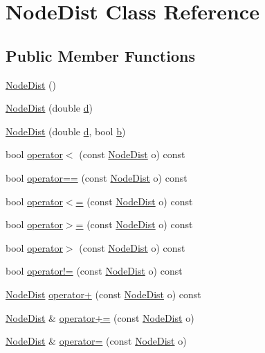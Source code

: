 \hypertarget{class_node_dist}{}\section{Node\+Dist Class Reference}
\label{class_node_dist}
\subsection*{Public Member Functions}
\begin{DoxyCompactItemize}
\item 
\hyperlink{class_node_dist_a8a756d7e58f75575ddc390228b01de6d}{Node\+Dist} ()
\item 
\hyperlink{class_node_dist_aa5fb8c1b973ebc583d68b9f9b2aa79a1}{Node\+Dist} (double \hyperlink{class_node_dist_a5fb5b79a3402236741cb30dc4197d01d}{d})
\item 
\hyperlink{class_node_dist_a637baaba0175576b8978ad3196e9e152}{Node\+Dist} (double \hyperlink{class_node_dist_a5fb5b79a3402236741cb30dc4197d01d}{d}, bool \hyperlink{class_node_dist_a47cf7839304cb579bf424c740105b504}{b})
\item 
bool \hyperlink{class_node_dist_a870c09fd5a0a479e48a80225ea272dce}{operator$<$} (const \hyperlink{class_node_dist}{Node\+Dist} o) const
\item 
bool \hyperlink{class_node_dist_a37d6967f24dcb319434820bec612d60b}{operator==} (const \hyperlink{class_node_dist}{Node\+Dist} o) const
\item 
bool \hyperlink{class_node_dist_a25302f8442909cd2f0b139736ebf6495}{operator$<$=} (const \hyperlink{class_node_dist}{Node\+Dist} o) const
\item 
bool \hyperlink{class_node_dist_a725a1c34f71222f72d78cad219401445}{operator$>$=} (const \hyperlink{class_node_dist}{Node\+Dist} o) const
\item 
bool \hyperlink{class_node_dist_a5b75f14b46a331069c659b28682599d9}{operator$>$} (const \hyperlink{class_node_dist}{Node\+Dist} o) const
\item 
bool \hyperlink{class_node_dist_aaf38ee32e58160dff2f04b30cb9d4a3f}{operator!=} (const \hyperlink{class_node_dist}{Node\+Dist} o) const
\item 
\hyperlink{class_node_dist}{Node\+Dist} \hyperlink{class_node_dist_a8c702c614546aa1d7ea579c2a8638dd5}{operator+} (const \hyperlink{class_node_dist}{Node\+Dist} o) const
\item 
\hyperlink{class_node_dist}{Node\+Dist} \& \hyperlink{class_node_dist_a0d35171b68fa4493f4cf65a421ee2682}{operator+=} (const \hyperlink{class_node_dist}{Node\+Dist} o)
\item 
\hyperlink{class_node_dist}{Node\+Dist} \& \hyperlink{class_node_dist_ac9fced75410273f578795dc15f132b50}{operator=} (const \hyperlink{class_node_dist}{Node\+Dist} o)
\end{DoxyCompactItemize}
